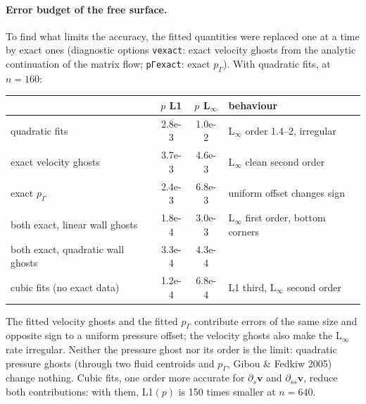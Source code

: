 \documentclass[11pt,a4paper]{article}
\newcommand{\code}[1]{\texttt{#1}}
\begin{document}
\paragraph{Error budget of the free surface.} To find what limits the accuracy, the fitted
quantities were replaced one at a time by exact ones (diagnostic options \code{vexact}: exact
velocity ghosts from the analytic continuation of the matrix flow; \code{pΓexact}: exact
$p_\Gamma$). With quadratic fits, at $n=160$:
\begin{center}
\small
\begin{tabular}{@{}l cc l@{}}
\toprule
& $p$ L1 & $p$ L$_\infty$ & behaviour\\
\midrule
quadratic fits                          & 2.8e-3 & 1.0e-2 & L$_\infty$ order 1.4--2, irregular\\
exact velocity ghosts                   & 3.7e-3 & 4.6e-3 & L$_\infty$ clean second order\\
exact $p_\Gamma$                        & 2.4e-3 & 6.8e-3 & uniform offset changes sign\\
both exact, linear wall ghosts          & 1.8e-4 & 3.0e-3 & L$_\infty$ first order, bottom corners\\
both exact, quadratic wall ghosts       & 3.3e-4 & 4.3e-4 & \\
cubic fits (no exact data)              & 1.2e-4 & 6.8e-4 & L1 third, L$_\infty$ second order\\
\bottomrule
\end{tabular}
\end{center}
The fitted velocity ghosts and the fitted $p_\Gamma$ contribute errors of the same size and
opposite sign to a uniform pressure offset; the velocity ghosts also make the L$_\infty$ rate
irregular. Neither the pressure ghost nor its order is the limit: quadratic pressure ghosts
(through two fluid centroids and $p_\Gamma$, Gibou \& Fedkiw 2005) change nothing. Cubic fits,
one order more accurate for $\partial_s\mathbf v$ and $\partial_{ss}\mathbf v$, reduce both
contributions: with them, L1$(p)$ is 150 times smaller at $n=640$.
\end{document}

